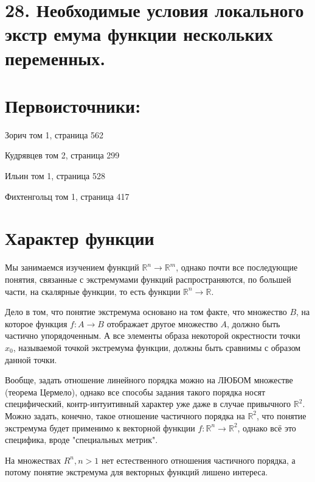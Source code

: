 \section{28. Необходимые условия локального экстр    емума функции нескольких переменных.}
\author{КН-101}


\maketitle

\section*{Первоисточники:}
\parindent=0cm
Зорич том 1, страница 562

Кудрявцев том 2, страница 299

Ильин том 1, страница 528

Фихтенгольц том 1, страница 417

\section{Характер функции}
\parindent=1cm
Мы занимаемся изучением функций $\mathbb{R}^n \to \mathbb{R}^m$, однако почти все последующие понятия, связанные с экстремумами функций распространяются, по большей части, на скалярные функции, то есть функции $\mathbb{R}^n \to \mathbb{R}$.

Дело в том, что понятие экстремума основано на том факте, что множество $B$, на которое функция $f: A \to B$ отображает другое множество $A$, должно быть частично упорядоченным. А все элементы образа некоторой окрестности точки $x_0$, называемой точкой экстремума функции, должны быть сравнимы с образом данной точки.

Вообще, задать отношение линейного порядка можно на ЛЮБОМ множестве (теорема Цермело), однако все способы задания такого порядка носят специфический, контр-интуитивный характер уже даже в случае привычного $\mathbb{R}^2$. Можно задать, конечно, такое отношение частичного порядка на $\mathbb{R}^2$, что понятие экстремума будет применимо к векторной функции $f: \mathbb{R}^n \to \mathbb{R}^2$, однако всё это специфика, вроде "специальных метрик". 

На множествах $R^n, n>1$ нет естественного отношения частичного порядка, а потому понятие экстремума для векторных функций лишено интереса.
